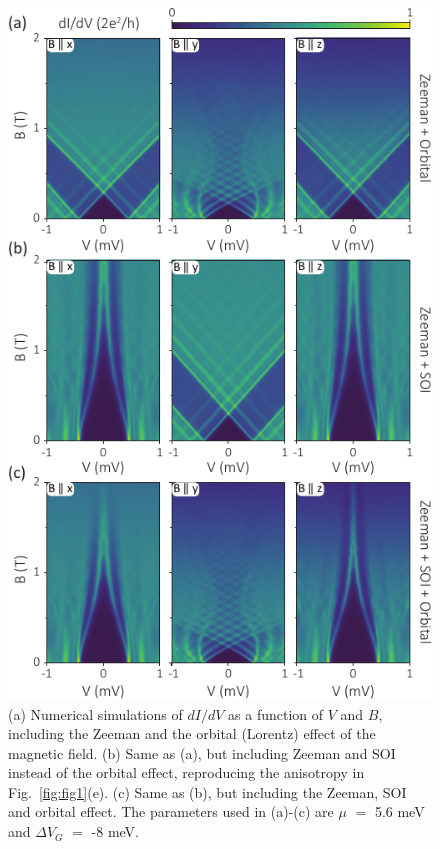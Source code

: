 \begin{figure}
\begin{center}
\includegraphics[width=0.7\columnwidth]{chapter_spinorbit/figures/Fig2.pdf}
\caption{\label{fig:fig2}
(a) Numerical simulations of $dI/dV$ as a function of $V$ and $B$, including the Zeeman and the orbital (Lorentz) effect of the magnetic field.
(b) Same as (a), but including Zeeman and SOI instead of the orbital effect, reproducing the anisotropy in Fig.~\ref{fig:fig1}(e).  %
(c) Same as (b), but including the Zeeman, SOI and orbital effect.
The parameters used in (a)-(c) are $\mu$ $=$ 5.6 meV and $\Delta V_G$ $=$ -8 meV.
}
\end{center}
\end{figure}

